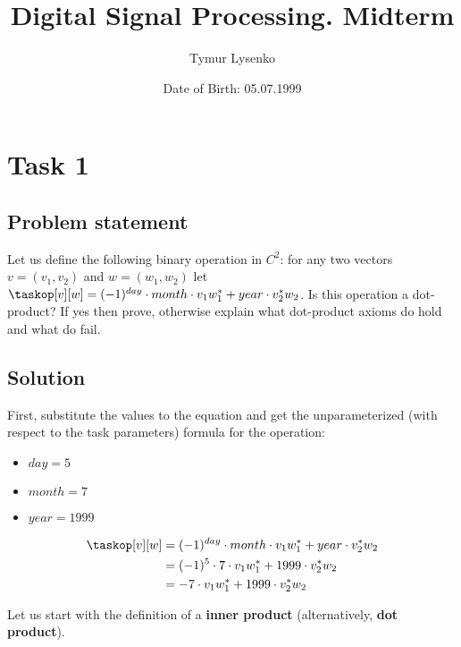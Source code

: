 \documentclass[a4paper]{article}
\title{Digital Signal Processing. Midterm}
\author{Tymur Lysenko}
\affil{BS18-02SE, Innopolis University}
\date{Date of Birth: 05.07.1999}
\theoremstyle{break}
\theoremstyle{break}
\begin{document}
\maketitle

\section{Task 1}

\subsection*{Problem statement}

Let us define the following binary operation \taskop in $C^{2}$: for any two vectors $v = (v_1, v_2)$ and $w = (w_1, w_2)$ let $\taskop[v][w] = (-1)^{day} \cdot month \cdot v_1w_1^* + year \cdot v_2^*w_2$. Is this operation a dot-product? If yes then prove, otherwise explain what dot-product axioms do hold and what do fail.

\subsection*{Solution}

First, substitute the values to the equation and get the unparameterized (with respect to the task parameters) formula for the operation:

\begin{itemize}
  \item $day = 5$
  \item $month = 7$
  \item $year = 1999$
\end{itemize}

\begin{equation*}
  \begin{split}
    \taskop[v][w]
      &= (-1)^{day} \cdot month \cdot v_1w_1^* + year \cdot v_2^*w_2\\
      &= (-1)^{5} \cdot 7 \cdot v_1w_1^* + 1999 \cdot v_2^*w_2\\
      &= -7 \cdot v_1w_1^* + 1999 \cdot v_2^*w_2
  \end{split}
\end{equation*}


Let us start with the definition of a \textbf{inner product} (alternatively, \textbf{dot product}).
\end{document}
